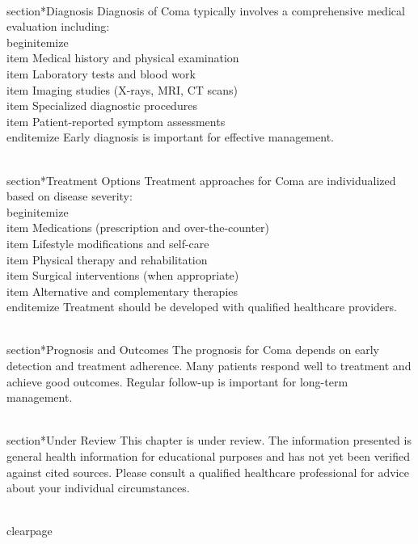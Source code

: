 \\section*{Diagnosis}
Diagnosis of Coma typically involves a comprehensive medical evaluation including:
\\begin{itemize}
  \\item Medical history and physical examination
  \\item Laboratory tests and blood work
  \\item Imaging studies (X-rays, MRI, CT scans)
  \\item Specialized diagnostic procedures
  \\item Patient-reported symptom assessments
\\end{itemize}
Early diagnosis is important for effective management.

\\section*{Treatment Options}
Treatment approaches for Coma are individualized based on disease severity:
\\begin{itemize}
  \\item Medications (prescription and over-the-counter)
  \\item Lifestyle modifications and self-care
  \\item Physical therapy and rehabilitation
  \\item Surgical interventions (when appropriate)
  \\item Alternative and complementary therapies
\\end{itemize}
Treatment should be developed with qualified healthcare providers.

\\section*{Prognosis and Outcomes}
The prognosis for Coma depends on early detection and treatment adherence. Many patients respond well to treatment and achieve good outcomes. Regular follow-up is important for long-term management.

\\section*{Under Review}
This chapter is under review. The information presented is general health information for educational purposes and has not yet been verified against cited sources. Please consult a qualified healthcare professional for advice about your individual circumstances.

\\clearpage
